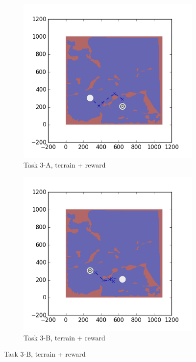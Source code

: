 \documentclass{tamuccthesis}
\begin{document}
\begin{figure}[H]
    \begin{subfigure}[b]{0.4\textwidth}
        \centering
        \includegraphics[width=\textwidth,trim={4cm 3cm 2cm 3cm},clip]{EXP3RG_PathCa_-1_-1_0_-1.png}
        \caption{Task 3-A, terrain + reward}  
        \label{fig:Path_3-A_terrain_reward}
    \end{subfigure}
    \hfill
    \begin{subfigure}[b]{0.4\textwidth}  
        \centering 
        \includegraphics[width=\textwidth,trim={4cm 3cm 2cm 3cm},clip]{EXP3RG_PathCb_-1_-1_0_-1.png}
        \caption{Task 3-B, terrain + reward}
        \label{fig:Path_3-B_terrain_reward}
    \end{subfigure}
    

\end{figure}
\end{document}
